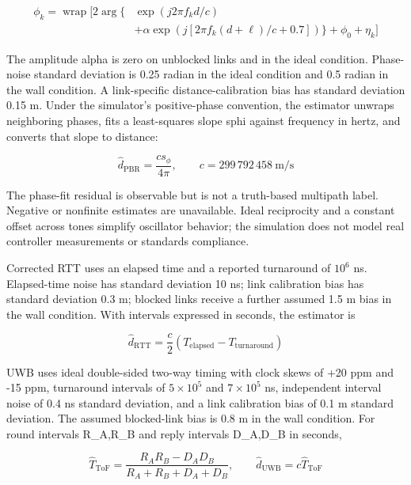 \documentclass[12pt,a4paper]{report}
\begin{document}
\begin{equation}
\begin{aligned}\phi_k=\operatorname{wrap}\bigl[2\arg\{&\exp(j2\pi f_kd/c)\\&+\alpha\exp(j[2\pi f_k(d+\ell)/c+0.7])\}+\phi_0+\eta_k\bigr]\end{aligned}
\label{eq:source3}
\end{equation}

The amplitude alpha is zero on unblocked links and in the ideal condition. Phase-noise standard deviation is 0.25 radian in the ideal condition and 0.5 radian in the wall condition. A link-specific distance-calibration bias has standard deviation 0.15 m. Under the simulator's positive-phase convention, the estimator unwraps neighboring phases, fits a least-squares slope sphi against frequency in hertz, and converts that slope to distance:

\begin{equation}
\widehat d_{\mathrm{PBR}}=\frac{c s_\phi}{4\pi},\qquad c=299\,792\,458\ \mathrm{m/s}
\label{eq:source4}
\end{equation}

The phase-fit residual is observable but is not a truth-based multipath label. Negative or nonfinite estimates are unavailable. Ideal reciprocity and a constant offset across tones simplify oscillator behavior; the simulation does not model real controller measurements or standards compliance.

Corrected RTT uses an elapsed time and a reported turnaround of \(10^6\) ns. Elapsed-time noise has standard deviation 10 ns; link calibration bias has standard deviation 0.3 m; blocked links receive a further assumed 1.5 m bias in the wall condition. With intervals expressed in seconds, the estimator is

\begin{equation}
\widehat d_{\mathrm{RTT}}=\frac{c}{2}(T_{\mathrm{elapsed}}-T_{\mathrm{turnaround}})
\label{eq:source5}
\end{equation}

UWB uses ideal double-sided two-way timing with clock skews of +20 ppm and -15 ppm, turnaround intervals of \(5\times10^5\) and \(7\times10^5\) ns, independent interval noise of 0.4 ns standard deviation, and a link calibration bias of 0.1 m standard deviation. The assumed blocked-link bias is 0.8 m in the wall condition. For round intervals R\_A,R\_B and reply intervals D\_A,D\_B in seconds,

\begin{equation}
\widehat T_{\mathrm{ToF}}=\frac{R_AR_B-D_AD_B}{R_A+R_B+D_A+D_B},\qquad \widehat d_{\mathrm{UWB}}=c\widehat T_{\mathrm{ToF}}
\label{eq:source6}
\end{equation}
\end{document}
